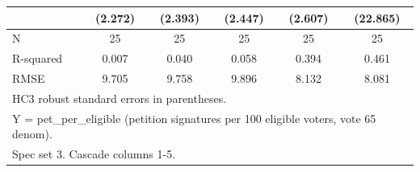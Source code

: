 \begin{table}[htbp]
\begin{tabular}{l*{5}{c}}
            &     (2.272)   &     (2.393)   &     (2.447)   &     (2.607)   &    (22.865)   \\
\midrule
N           &          25   &          25   &          25   &          25   &          25   \\
R-squared   &       0.007   &       0.040   &       0.058   &       0.394   &       0.461   \\
RMSE        &       9.705   &       9.758   &       9.896   &       8.132   &       8.081   \\
\bottomrule
\multicolumn{6}{l}{\footnotesize HC3 robust standard errors in parentheses.}\\
\multicolumn{6}{l}{\footnotesize Y = pet\_per\_eligible (petition signatures per 100 eligible voters, vote 65 denom).}\\
\multicolumn{6}{l}{\footnotesize Spec set 3. Cascade columns 1-5.}\\
\end{tabular}
\end{table}
